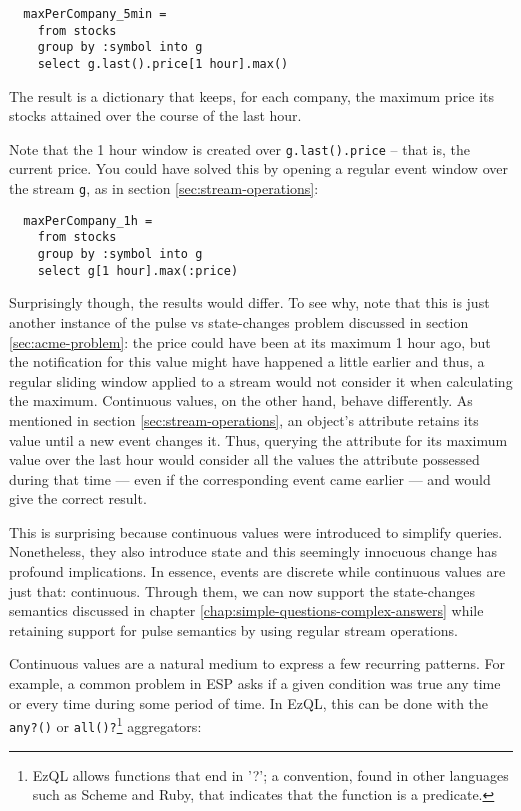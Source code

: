 \documentclass[a4,11pt]{report}
\begin{document}
\begin{lstlisting}
  maxPerCompany_5min =
    from stocks
    group by :symbol into g
    select g.last().price[1 hour].max()
\end{lstlisting}

The result is a dictionary that keeps, for each company, the maximum
price its stocks attained over the course of the last hour.

Note that the 1 hour window is created over \verb=g.last().price= --
that is, the current price. You could have solved this by opening a
regular event window over the stream \verb=g=, as in section
\ref{sec:stream-operations}:

\begin{lstlisting}
  maxPerCompany_1h =
    from stocks
    group by :symbol into g
    select g[1 hour].max(:price)
\end{lstlisting}

Surprisingly though, the results would differ. To see why, note that
this is just another instance of the pulse vs state-changes problem
discussed in section \ref{sec:acme-problem}: the price could have been
at its maximum 1 hour ago, but the notification for this value might
have happened a little earlier and thus, a regular sliding window
applied to a stream would not consider it when calculating the
maximum. Continuous values, on the other hand, behave differently. As
mentioned in section \ref{sec:stream-operations}, an object's
attribute retains its value until a new event changes it. Thus,
querying the attribute for its maximum value over the last hour would
consider all the values the attribute possessed during that time ---
even if the corresponding event came earlier --- and would give the
correct result.

This is surprising because continuous values were introduced to
simplify queries. Nonetheless, they also introduce state and this
seemingly innocuous change has profound implications. In essence,
events are discrete while continuous values are just that:
continuous. Through them, we can now support the state-changes
semantics discussed in chapter
\ref{chap:simple-questions-complex-answers} while retaining support
for pulse semantics by using regular stream operations.

Continuous values are a natural medium to express a few recurring
patterns. For example, a common problem in ESP asks if a given
condition was true any time or every time during some period of
time. In EzQL, this can be done with the \verb=any?()= or
\verb=all()?=\footnote{EzQL allows functions that end in '?'; a
  convention, found in other languages such as Scheme and Ruby, that
  indicates that the function is a predicate.}  aggregators:
\end{document}
